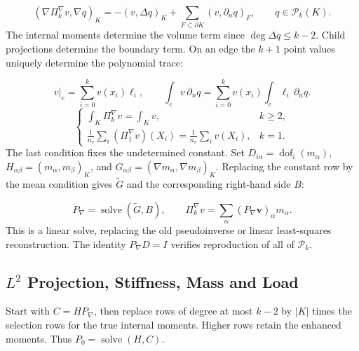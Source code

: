 \documentclass[11pt,oneside]{book}
\theoremstyle{definition}
\theoremstyle{plain}
\begin{document}
\begin{equation}
(\nabla\Pi_k^\nabla v,\nabla q)_K
=-(v,\Delta q)_K+\sum_{F\subset\partial K}(v,\partial_n q)_F,
\qquad q\in\mathcal P_k(K).
\label{eq:vem-proj}
\end{equation}
The internal moments determine the volume term since $\deg\Delta q\le k-2$.
Child projections determine the boundary term. On an edge the $k+1$ point values
uniquely determine the polynomial trace:

\begin{equation}
v|_e=\sum_{i=0}^{k}v(x_i)\ell_i,\qquad
\int_e v\,\partial_nq=\sum_{i=0}^{k}v(x_i)\int_e\ell_i\,\partial_nq.
\label{eq:vem-edge}
\end{equation}
\begin{equation}
\begin{cases}
\displaystyle\int_K\Pi_k^\nabla v=\int_Kv,& k\ge2,\\
\displaystyle\frac1{n_v}\sum_i(\Pi_1^\nabla v)(X_i)
=\frac1{n_v}\sum_i v(X_i),&k=1.
\end{cases}
\label{eq:vem-const}
\end{equation}
The last condition fixes the undetermined constant. Set
$D_{i\alpha}=\operatorname{dof}_i(m_\alpha)$,
$H_{\alpha\beta}=(m_\alpha,m_\beta)_K$, and
$G_{\alpha\beta}=(\nabla m_\alpha,\nabla m_\beta)_K$.
Replacing the constant row by the mean condition gives $\widetilde G$ and the
corresponding right-hand side $B$:

\begin{equation}
P_\nabla=\operatorname{solve}(\widetilde G,B),\qquad
\Pi_k^\nabla v=\sum_\alpha(P_\nabla\mathbf v)_\alpha m_\alpha.
\label{eq:vem-pi}
\end{equation}
This is a linear solve, replacing the old pseudoinverse or linear least-squares
reconstruction. The identity $P_\nabla D=I$ verifies reproduction of all of $\mathcal P_k$.

\subsection{$L^2$ Projection, Stiffness, Mass and Load}
Start with $C=HP_\nabla$, then replace rows of degree at most $k-2$ by $|K|$ times
the selection rows for the true internal moments. Higher rows retain the enhanced
moments. Thus $P_0=\operatorname{solve}(H,C)$.
\end{document}

